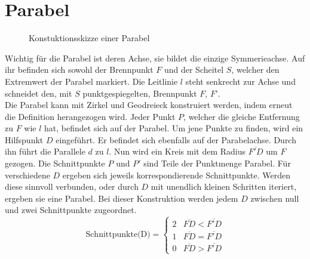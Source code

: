 \section{Parabel}
\begin{figure}[h]
	\centering
		\resizebox{.5\linewidth}{!}{
			
		}
	\caption{Konstuktionsskizze einer Parabel}
\end{figure}
Wichtig für die Parabel ist deren Achse, sie bildet die einzige Symmerieachse. Auf ihr befinden sich sowohl der Brennpunkt $F$ und der Scheitel $S$, welcher den Extremwert der Parabel markiert. Die Leitlinie $l$ steht senkrecht zur Achse und schneidet den, mit $S$ punktgespiegelten, Brennpunkt $F$, $F’$.\\
Die Parabel kann mit Zirkel und Geodreieck konstruiert\cite[S.159]{Malle:2011} werden, indem erneut die Definition herangezogen wird. Jeder Punkt $P$, welcher die gleiche Entfernung zu $F$ wie $l$ hat, befindet sich auf der Parabel. Um jene Punkte zu finden, wird ein Hilfspunkt $D$ eingeführt. Er befindet sich ebenfalls auf der Parabelachse. Durch ihn führt die Parallele $d$ zu $l$. Nun wird ein Kreis mit dem Radius $\overline{F'D}$ um $F$ gezogen. Die Schnittpunkte $P$ und $P'$ sind Teile der Punktmenge Parabel. Für verschiedene $D$ ergeben sich jeweils korrespondierende Schnittpunkte. Werden diese sinnvoll verbunden, oder durch $D$ mit unendlich kleinen Schritten iteriert, ergeben sie eine Parabel. Bei dieser Konstruktion werden jedem $D$ zwischen null und zwei Schnittpunkte zugeordnet.
\begin{displaymath}
   \text{Schnittpunkte(D)} = \left\{
     \begin{array}{lr}
       2 & \overline{FD} < \overline{F'D}\\
       1 & \overline{FD} = \overline{F'D}\\
       0 & \overline{FD} > \overline{F'D}
     \end{array}
   \right.
\end{displaymath}
